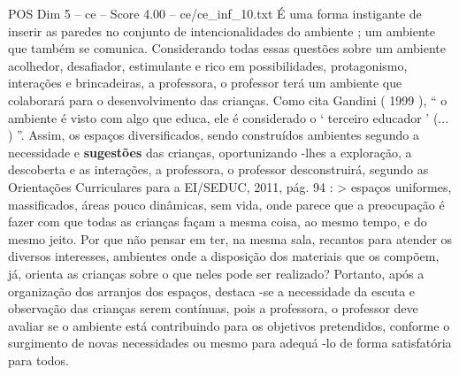 \begin{textsample}{POS Dim 5 – ce – Score 4.00 – ce/ce\_inf\_10.txt}
É uma forma instigante de inserir as paredes no conjunto de intencionalidades do ambiente ; um ambiente que também se comunica.
Considerando todas essas questões sobre um ambiente acolhedor, desafiador, estimulante e rico em possibilidades, protagonismo, interações e brincadeiras, a professora, o professor terá um ambiente que colaborará para o desenvolvimento das crianças.
Como cita Gandini ( 1999 ), “ o ambiente é visto com algo que educa, ele é considerado o ‘ terceiro educador ’ (... ) ”.
Assim, os espaços diversificados, sendo construídos ambientes segundo a necessidade e \textbf{sugestões} das crianças, oportunizando -lhes a exploração, a descoberta e as interações, a professora, o professor desconstruirá, segundo as Orientações Curriculares para a EI/SEDUC, 2011, pág. 94 : > espaços uniformes, massificados, áreas pouco dinâmicas, sem vida, onde parece que a preocupação é fazer com que todas as crianças façam a mesma coisa, ao mesmo tempo, e do mesmo jeito.
Por que não pensar em ter, na mesma sala, recantos para atender os diversos interesses, ambientes onde a disposição dos materiais que os compõem, já, orienta as crianças sobre o que neles pode ser realizado?
Portanto, após a organização dos arranjos dos espaços, destaca -se a necessidade da escuta e observação das crianças serem contínuas, pois a professora, o professor deve avaliar se o ambiente está contribuindo para os objetivos pretendidos, conforme o surgimento de novas necessidades ou mesmo para adequá -lo de forma satisfatória para todos.

\end{textsample}

